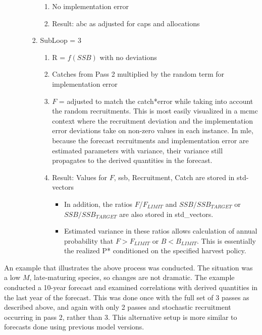 \begin{enumerate}
\begin{enumerate}
\begin{enumerate}
\begin{enumerate}
				\item No implementation error
				\item Result: \gls{abc} as adjusted for caps and allocations
			\end{enumerate}
			\item SubLoop = 3
			\begin{enumerate}
				\item R = $f(SSB)$ with no deviations
				\item Catches from Pass 2 multiplied by the random term for implementation error
				\item $F$ = adjusted to match the catch*error while taking into account the random recruitments. This is most easily visualized in a \gls{mcmc} context where the recruitment deviation and the implementation error deviations take on non-zero values in each instance. In \gls{mle}, because the forecast recruitments and implementation error are estimated parameters with variance, their variance still propagates to the derived quantities in the forecast.
				\item Result: Values for $F$, \gls{ssb}, Recruitment, Catch are stored in std-vectors
				\begin{itemize}
					\item In addition, the ratios $F$/$F_{LIMIT}$ and $SSB/SSB_{TARGET}$ or $SSB/SSB_{TARGET}$ are also stored in std\_vectors.
					\item Estimated variance in these ratios allows calculation of annual probability that $F > F_{LIMIT}$ or $B < B_{LIMIT}$. This is essentially the realized P* conditioned on the specified harvest policy.
				\end{itemize}
			\end{enumerate}
		\end{enumerate}
	\end{enumerate}
\end{enumerate}

An example that illustrates the above process was conducted. The situation was a low $M$, late-maturing species, so changes are not dramatic. The example conducted a 10-year forecast and examined correlations with derived quantities in the last year of the forecast. This was done once with the full set of 3 passes as described above, and again with only 2 passes and stochastic recruitment occurring in pass 2, rather than 3. This alternative setup is more similar to forecasts done using previous model versions.

